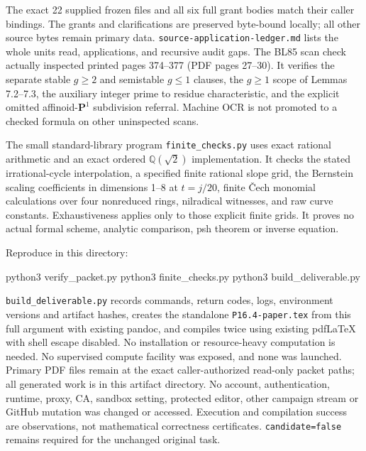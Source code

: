 \documentclass[
  11pt,
]{article}
\newenvironment{Shaded}{}{}
\newcommand{\ExtensionTok}[1]{#1}
\newcommand{\NormalTok}[1]{#1}
\begin{document}
The exact 22 supplied frozen files and all six full grant bodies match
their caller bindings. The grants and clarifications are preserved
byte-bound locally; all other source bytes remain primary data.
\texttt{source-application-ledger.md} lists the whole units read,
applications, and recursive audit gaps. The BL85 scan check actually
inspected printed pages 374--377 (PDF pages 27--30). It verifies the
separate stable \(g\geq2\) and semistable \(g\leq1\) clauses, the
\(g\geq1\) scope of Lemmas 7.2--7.3, the auxiliary integer prime to
residue characteristic, and the explicit omitted
affinoid-\(\mathbf P^1\) subdivision referral. Machine OCR is not
promoted to a checked formula on other uninspected scans.

The small standard-library program \texttt{finite\_checks.py} uses exact
rational arithmetic and an exact ordered \(\mathbb Q(\sqrt2)\)
implementation. It checks the stated irrational-cycle interpolation, a
specified finite rational slope grid, the Bernstein scaling coefficients
in dimensions 1--8 at \(t=j/20\), finite Čech monomial calculations over
four nonreduced rings, nilradical witnesses, and raw curve constants.
Exhaustiveness applies only to those explicit finite grids. It proves no
actual formal scheme, analytic comparison, psh theorem or inverse
equation.

Reproduce in this directory:

\begin{Shaded}
\begin{Highlighting}[]
\ExtensionTok{python3}\NormalTok{ verify\_packet.py}
\ExtensionTok{python3}\NormalTok{ finite\_checks.py}
\ExtensionTok{python3}\NormalTok{ build\_deliverable.py}
\end{Highlighting}
\end{Shaded}

\texttt{build\_deliverable.py} records commands, return codes, logs,
environment versions and artifact hashes, creates the standalone
\texttt{P16.4-paper.tex} from this full argument with existing pandoc,
and compiles twice using existing pdfLaTeX with shell escape disabled.
No installation or resource-heavy computation is needed. No supervised
compute facility was exposed, and none was launched. Primary PDF files
remain at the exact caller-authorized read-only packet paths; all
generated work is in this artifact directory. No account,
authentication, runtime, proxy, CA, sandbox setting, protected editor,
other campaign stream or GitHub mutation was changed or accessed.
Execution and compilation success are observations, not mathematical
correctness certificates. \texttt{candidate=false} remains required for
the unchanged original task.
\end{document}
